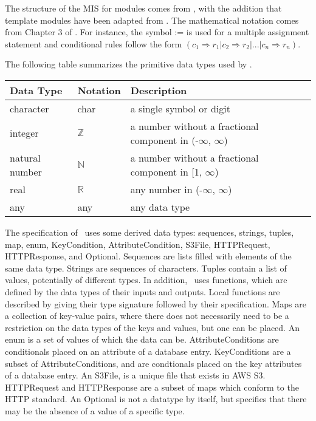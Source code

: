 \documentclass[12pt, titlepage]{article}
\begin{document}

The structure of the MIS for modules comes from \citet{HoffmanAndStrooper1995},
with the addition that template modules have been adapted from
\cite{GhezziEtAl2003}.  The mathematical notation comes from Chapter 3 of
\citet{HoffmanAndStrooper1995}.  For instance, the symbol := is used for a
multiple assignment statement and conditional rules follow the form $(c_1
\Rightarrow r_1 | c_2 \Rightarrow r_2 | ... | c_n \Rightarrow r_n )$.

The following table summarizes the primitive data types used by \progname.

\begin{center}
  \renewcommand{\arraystretch}{1.2}
  \noindent
  \begin{tabular}{l l p{7.5cm}}
    \toprule
    \textbf{Data Type} & \textbf{Notation} & \textbf{Description}\\
    \midrule
    character & char & a single symbol or digit\\
    integer & $\mathbb{Z}$ & a number without a fractional component
    in (-$\infty$, $\infty$) \\
    natural number & $\mathbb{N}$ & a number without a fractional
    component in [1, $\infty$) \\
    real & $\mathbb{R}$ & any number in (-$\infty$, $\infty$)\\
    any & any & any data type\\
    \bottomrule
  \end{tabular}
\end{center}

\noindent
The specification of \progname \ uses some derived data types:
sequences, strings, tuples, map, enum, KeyCondition,
AttributeCondition, S3File, HTTPRequest, HTTPResponse, and Optional. Sequences
are lists filled with elements of the same data type. Strings
are sequences of characters. Tuples contain a list of values, potentially of
different types. In addition, \progname \ uses functions, which
are defined by the data types of their inputs and outputs. Local functions are
described by giving their type signature followed by their specification. Maps
are a collection of key-value pairs, where there does not necessarily need to
be a restriction on the data types of the keys and values, but one can be
placed. An enum is a set of values of which the data can be.
AttributeConditions are conditionals placed on an attribute of a
database entry. KeyConditions are a subset of AttributeConditions,
and are condtionals placed on the key attributes of a database entry.
An S3File, is a unique file that exists in AWS S3. HTTPRequest and HTTPResponse
are a subset of maps which conform to the HTTP standard. An Optional is not a
datatype by itself, but specifies that there may be the absence of a value of a
specific type.
\end{document}
